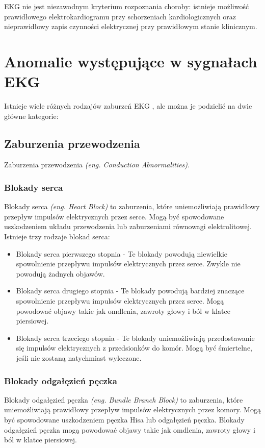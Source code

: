 \documentclass[12pt,a4paper]{article}
\begin{document}
EKG nie jest niezawodnym kryterium rozpoznania choroby: istnieje możliwość prawidłowego elektrokardiogramu przy schorzeniach kardiologicznych oraz nieprawidłowy zapis czynności elektrycznej przy prawidłowym stanie klinicznym. 

\newpage{}

\section{Anomalie występujące w sygnałach EKG}
Istnieje wiele różnych rodzajów zaburzeń EKG \cite{ecg-abnormalities}, ale można je podzielić na dwie główne kategorie:

\subsection{Zaburzenia przewodzenia}
Zaburzenia przewodzenia \textit{(eng. Conduction Abnormalities)}.

\subsubsection{Blokady serca}
Blokady serca \textit{(eng. Heart Block)} to zaburzenia, które uniemożliwiają prawidłowy przepływ impulsów elektrycznych przez serce. Mogą być spowodowane uszkodzeniem układu przewodzenia lub zaburzeniami równowagi elektrolitowej. Istnieje trzy rodzaje blokad serca:
\begin{itemize}
    \item Blokady serca pierwszego stopnia - Te blokady powodują niewielkie spowolnienie przepływu impulsów elektrycznych przez serce. Zwykle nie powodują żadnych objawów.
    \item Blokady serca drugiego stopnia - Te blokady powodują bardziej znaczące spowolnienie przepływu impulsów elektrycznych przez serce. Mogą powodować objawy takie jak omdlenia, zawroty głowy i ból w klatce piersiowej.
    \item Blokady serca trzeciego stopnia - Te blokady uniemożliwiają przedostawanie się impulsów elektrycznych z przedsionków do komór. Mogą być śmiertelne, jeśli nie zostaną natychmiast wyleczone.
\end{itemize}

\subsubsection{Blokady odgałęzień pęczka}
Blokady odgałęzień pęczka \textit{(eng. Bundle Branch Block)} to zaburzenia, które uniemożliwiają prawidłowy przepływ impulsów elektrycznych przez komory. Mogą być spowodowane uszkodzeniem pęczka Hisa lub odgałęzień pęczka. Blokady odgałęzień pęczka mogą powodować objawy takie jak omdlenia, zawroty głowy i ból w klatce piersiowej.
\end{document}
